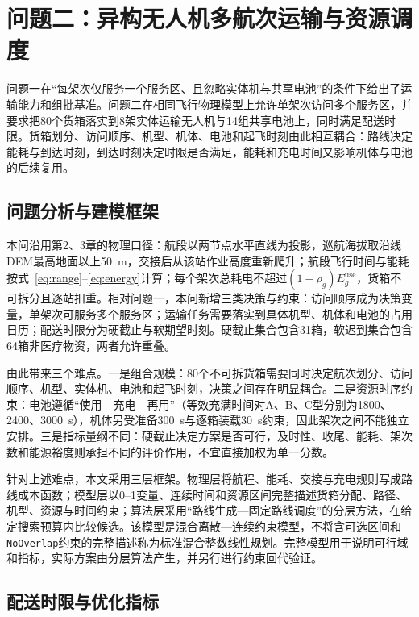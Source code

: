 \section{问题二：异构无人机多航次运输与资源调度}

问题一在“每架次仅服务一个服务区、且忽略实体机与共享电池”的条件下给出了运输能力和组批基准。问题二在相同飞行物理模型上允许单架次访问多个服务区，并要求把80个货箱落实到8架实体运输无人机与14组共享电池上，同时满足配送时限。货箱划分、访问顺序、机型、机体、电池和起飞时刻由此相互耦合：路线决定能耗与到达时刻，到达时刻决定时限是否满足，能耗和充电时间又影响机体与电池的后续复用。

\subsection{问题分析与建模框架}

本问沿用第2、3章的物理口径：航段以两节点水平直线为投影，巡航海拔取沿线DEM最高地面以上50~m，交接后从该站作业高度重新爬升；航段飞行时间与能耗按式~\eqref{eq:range}--\eqref{eq:energy}计算；每个架次总耗电不超过$(1-\rho_g)E_g^{\mathrm{use}}$，货箱不可拆分且逐站扣重。相对问题一，本问新增三类决策与约束：访问顺序成为决策变量，单架次可服务多个服务区；运输任务需要落实到具体机型、机体和电池的占用日历；配送时限分为硬截止与软期望时刻。硬截止集合包含31箱，软迟到集合包含64箱非医疗物资，两者允许重叠。

由此带来三个难点。{\heiti 一是组合规模}：80个不可拆货箱需要同时决定航次划分、访问顺序、机型、实体机、电池和起飞时刻，决策之间存在明显耦合。{\heiti 二是资源时序约束}：电池遵循“使用—充电—再用”（等效充满时间对A、B、C型分别为1800、2400、3000~s），机体另受准备300~s与逐箱装载30~s约束，因此架次之间不能独立安排。{\heiti 三是指标量纲不同}：硬截止决定方案是否可行，及时性、收尾、能耗、架次数和能源裕度则承担不同的评价作用，不宜直接加权为单一分数。

针对上述难点，本文采用三层框架。物理层将航程、能耗、交接与充电规则写成路线成本函数；模型层以0--1变量、连续时间和资源区间完整描述货箱分配、路径、机型、资源与时间约束；算法层采用“路线生成—固定路线调度”的分层方法，在给定搜索预算内比较候选。该模型是混合离散—连续约束模型，不将含可选区间和\texttt{NoOverlap}约束的完整描述称为标准混合整数线性规划。完整模型用于说明可行域和指标，实际方案由分层算法产生，并另行进行约束回代验证。

\subsection{配送时限与优化指标}

